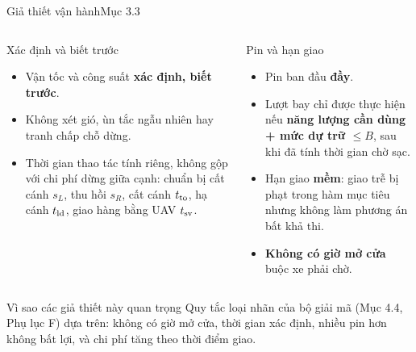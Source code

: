 \documentclass[aspectratio=169,10pt,t,xcolor={table}]{beamer}
\newcommand{\src}[1]{\hfill{\normalfont\footnotesize\color{white!62!navy}#1}}  %
\begin{document}
\begin{frame}{Giả thiết vận hành\src{Mục 3.3}}
\begin{columns}[T,onlytextwidth]
\begin{block}{Xác định và biết trước}
\footnotesize
\begin{itemize}
\item Vận tốc và công suất \textbf{xác định, biết trước}.
\item Không xét gió, ùn tắc ngẫu nhiên hay tranh chấp chỗ dừng.
\item Thời gian thao tác tính riêng, không gộp với chi phí dừng giữa cạnh:
  chuẩn bị cất cánh $s_L$, thu hồi $s_R$, cất cánh $t_{\rm to}$, hạ cánh $t_{\rm ld}$, giao hàng bằng UAV $t_{\rm sv}$.
\end{itemize}
\end{block}
\begin{block}{Pin và hạn giao}
\footnotesize
\begin{itemize}
\item Pin ban đầu \textbf{đầy}.
\item Lượt bay chỉ được thực hiện nếu \textbf{năng lượng cần dùng + mức dự trữ $\le B$}, sau khi đã tính thời gian chờ sạc.
\item Hạn giao \textbf{mềm}: giao trễ bị phạt trong hàm mục tiêu nhưng không làm phương án bất khả thi.
\item \textbf{Không có giờ mở cửa} buộc xe phải chờ.
\end{itemize}
\end{block}
\end{columns}
\vspace{6pt}
\begin{exampleblock}{Vì sao các giả thiết này quan trọng}
\footnotesize Quy tắc loại nhãn của bộ giải mã (Mục 4.4, Phụ lục F) dựa trên: không có giờ mở cửa, thời gian xác định,
nhiều pin hơn không bất lợi, và chi phí tăng theo thời điểm giao.
\end{exampleblock}
\end{frame}
\end{document}
